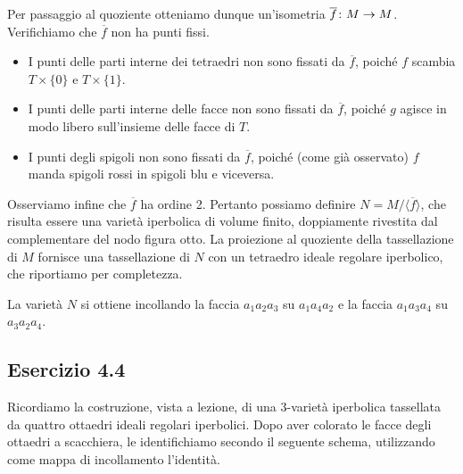 Per passaggio al quoziente otteniamo dunque un'isometria $\map{\overline{f}}{M}{M}$. Verifichiamo che $\overline{f}$ non ha punti fissi.
\begin{itemize}
\item I punti delle parti interne dei tetraedri non sono fissati da $\overline{f}$, poiché $f$ scambia $T\times\{0\}$ e $T\times\{1\}$.
\item I punti delle parti interne delle facce non sono fissati da $\overline{f}$, poiché $g$ agisce in modo libero sull'insieme delle facce di $T$.
\item I punti degli spigoli non sono fissati da $\overline{f}$, poiché (come già osservato) $f$ manda spigoli rossi in spigoli blu e viceversa.
\end{itemize}

Osserviamo infine che $\overline{f}$ ha ordine 2. Pertanto possiamo definire $N=M/\langle\overline{f}\rangle$, che risulta essere una varietà iperbolica di volume finito, doppiamente rivestita dal complementare del nodo figura otto. La proiezione al quoziente della tassellazione di $M$ fornisce una tassellazione di $N$ con un tetraedro ideale regolare iperbolico, che riportiamo per completezza.
\begin{center}
\end{center}
La varietà $N$ si ottiene incollando la faccia $a_1a_2a_3$ su $a_1a_4a_2$ e la faccia $a_1a_3a_4$ su $a_3a_2a_4$.

\newpage
\subsection*{Esercizio 4.4}
Ricordiamo la costruzione, vista a lezione, di una $3$-varietà iperbolica tassellata da quattro ottaedri ideali regolari iperbolici. Dopo aver colorato le facce degli ottaedri a scacchiera, le identifichiamo secondo il seguente schema, utilizzando come mappa di incollamento l'identità.

